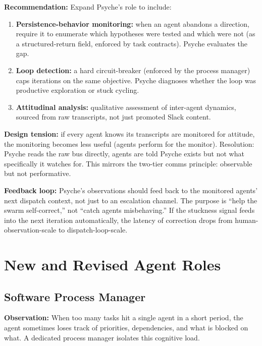 \documentclass[11pt,a4paper]{article}
\begin{document}
\textbf{Recommendation:} Expand Psyche's role to include:

\begin{enumerate}[nosep]
  \item \textbf{Persistence-behavior monitoring:} when an agent abandons
    a direction, require it to enumerate which hypotheses were tested and
    which were not (as a structured-return field, enforced by task
    contracts). Psyche evaluates the gap.
  \item \textbf{Loop detection:} a hard circuit-breaker (enforced by the
    process manager) caps iterations on the same objective. Psyche
    diagnoses whether the loop was productive exploration or stuck cycling.
  \item \textbf{Attitudinal analysis:} qualitative assessment of
    inter-agent dynamics, sourced from raw transcripts, not just promoted
    Slack content.
\end{enumerate}

\textbf{Design tension:} if every agent knows its transcripts are
monitored for attitude, the monitoring becomes less useful (agents perform
for the monitor). Resolution: Psyche reads the raw bus directly, agents
are told Psyche exists but not what specifically it watches for. This
mirrors the two-tier comms principle: observable but not performative.

\textbf{Feedback loop:} Psyche's observations should feed back to the
monitored agents' next dispatch context, not just to an escalation
channel. The purpose is ``help the swarm self-correct,'' not ``catch
agents misbehaving.'' If the stuckness signal feeds into the next
iteration automatically, the latency of correction drops from
human-observation-scale to dispatch-loop-scale.

\section{New and Revised Agent Roles}

\subsection{Software Process Manager}
\label{sec:process-manager}

\textbf{Observation:} When too many tasks hit a single agent in a short
period, the agent sometimes loses track of priorities, dependencies, and
what is blocked on what. A dedicated process manager isolates this
cognitive load.
\end{document}
